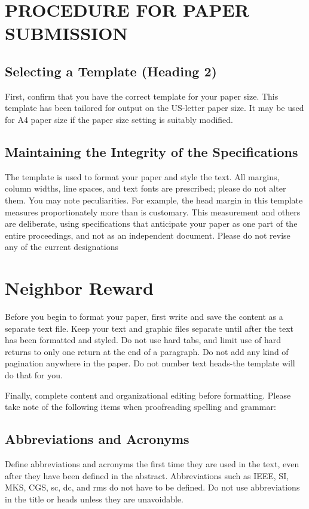 \documentclass[letterpaper, 10 pt, conference]{ieeeconf}  %
\begin{document}
\section{PROCEDURE FOR PAPER SUBMISSION}

\subsection{Selecting a Template (Heading 2)}

First, confirm that you have the correct template for your paper size. This template has been tailored for output on the US-letter paper size. 
It may be used for A4 paper size if the paper size setting is suitably modified.

\subsection{Maintaining the Integrity of the Specifications}

The template is used to format your paper and style the text. All margins, column widths, line spaces, and text fonts are prescribed; please do not alter them. You may note peculiarities. For example, the head margin in this template measures proportionately more than is customary. This measurement and others are deliberate, using specifications that anticipate your paper as one part of the entire proceedings, and not as an independent document. Please do not revise any of the current designations

\section{Neighbor Reward}


Before you begin to format your paper, first write and save the content as a separate text file. Keep your text and graphic files separate until after the text has been formatted and styled. Do not use hard tabs, and limit use of hard returns to only one return at the end of a paragraph. Do not add any kind of pagination anywhere in the paper. Do not number text heads-the template will do that for you.

Finally, complete content and organizational editing before formatting. Please take note of the following items when proofreading spelling and grammar:

\subsection{Abbreviations and Acronyms} Define abbreviations and acronyms the first time they are used in the text, even after they have been defined in the abstract. Abbreviations such as IEEE, SI, MKS, CGS, sc, dc, and rms do not have to be defined. Do not use abbreviations in the title or heads unless they are unavoidable.
\end{document}

